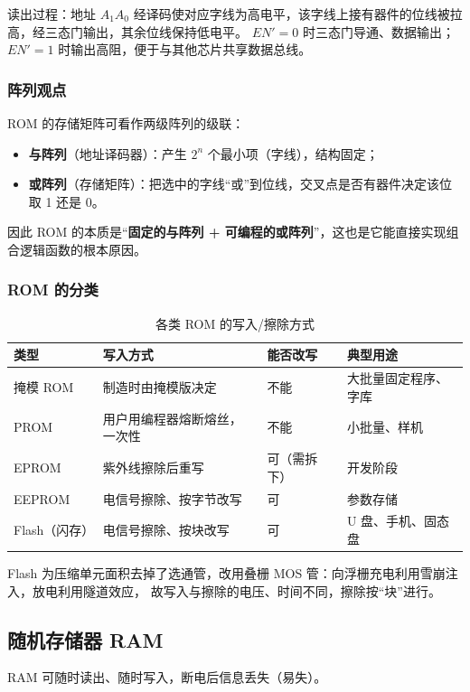 读出过程：地址 $A_1A_0$ 经译码使对应字线为高电平，该字线上接有器件的位线被拉高，经三态门输出，其余位线保持低电平。
$EN'=0$ 时三态门导通、数据输出；$EN'=1$ 时输出高阻，便于与其他芯片共享数据总线。

\subsubsection{阵列观点}
ROM 的存储矩阵可看作两级阵列的级联：
\begin{itemize}
    \item \textbf{与阵列}（地址译码器）：产生 $2^n$ 个最小项（字线），结构固定；
    \item \textbf{或阵列}（存储矩阵）：把选中的字线“或”到位线，交叉点是否有器件决定该位取 1 还是 0。
\end{itemize}
因此 ROM 的本质是“\textbf{固定的与阵列 + 可编程的或阵列}”，这也是它能直接实现组合逻辑函数的根本原因。

\subsubsection{ROM 的分类}
\begin{table}[!htbp]
\centering
\caption{各类 ROM 的写入/擦除方式}
\begin{tabular}{llll}
\toprule
类型 & 写入方式 & 能否改写 & 典型用途 \\
\midrule
掩模 ROM & 制造时由掩模版决定 & 不能 & 大批量固定程序、字库 \\
PROM & 用户用编程器熔断熔丝，一次性 & 不能 & 小批量、样机 \\
EPROM & 紫外线擦除后重写 & 可（需拆下） & 开发阶段 \\
EEPROM & 电信号擦除、按字节改写 & 可 & 参数存储 \\
Flash（闪存） & 电信号擦除、按块改写 & 可 & U 盘、手机、固态盘 \\
\bottomrule
\end{tabular}
\end{table}

\noindent Flash 为压缩单元面积去掉了选通管，改用叠栅 MOS 管：向浮栅充电利用雪崩注入，放电利用隧道效应，
故写入与擦除的电压、时间不同，擦除按“块”进行。

\subsection{随机存储器 RAM}
RAM 可随时读出、随时写入，断电后信息丢失（易失）。
